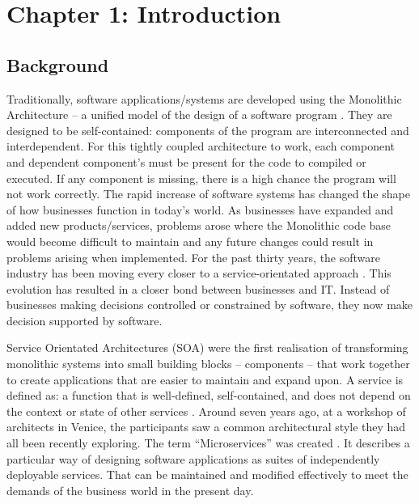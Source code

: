 \section{Chapter 1: Introduction}
	\subsection{Background}
	Traditionally, software applications/systems are developed using the Monolithic Architecture – a unified model of the design of a software program \cite{MonolithMargaret}. They are designed to be self-contained: components of the program are interconnected and interdependent. For this tightly coupled architecture to work, each component and dependent component’s must be present for the code to compiled or executed. If any component is missing, there is a high chance the program will not work correctly.
	The rapid increase of software systems has changed the shape of how businesses function in today’s world. As businesses have expanded and added new products/services, problems arose where the Monolithic code base would become difficult to maintain and any future changes could result in problems arising when implemented.
	For the past thirty years, the software industry has been moving every closer to a service-orientated approach \cite{SoADummies}. This evolution has resulted in a closer bond between businesses and IT. Instead of businesses making decisions controlled or constrained by software, they now make decision supported by software. 
	
	Service Orientated Architectures (SOA) were the first realisation of transforming monolithic systems into small building blocks – components – that work together to create applications that are easier to maintain and expand upon. A service is defined as: a function that is well-defined, self-contained, and does not depend on the context or state of other services \cite{ServiceArchiBarry}.
	Around seven years ago, at a workshop of architects in Venice, the participants saw a common architectural style they had all been recently exploring. The term “Microservices” was created \cite{MartinFowlersite}. It describes a particular way of designing software applications as suites of independently deployable services. That can be maintained and modified effectively to meet the demands of the business world in the present day.
	
